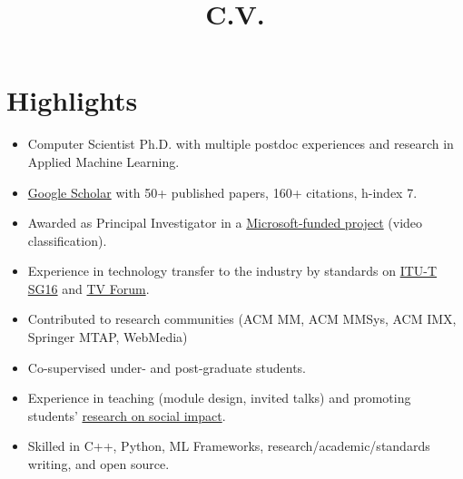 \documentclass[10pt,a4paper,sans,colorlinks]{moderncv}
\title{C.V.}
\begin{document}
\setHyperrefBlueLinks
\makecvtitle
\vspace{-2em}

\section{Highlights}

\begin{itemize}
    \item Computer Scientist Ph.D. with multiple postdoc experiences and research in Applied Machine Learning.
    \item \href{https://scholar.google.com/citations?user=1bEOmkUAAAAJ&hl=en}{Google Scholar} with 50+ published papers, 160+ citations, h-index 7.
    \item Awarded  as Principal Investigator in a \href{https://www.rnp.br/en/rnp-and-microsoft-challenge-artificial-intelligence}{Microsoft-funded project} (video classification).
    \item Experience in technology transfer to the industry by standards on \href{http://www.itu.int/en/ITU-T/studygroups/2022-2024/16}{ITU-T SG16} and \href{http://forumsbtvd.org.br}{TV Forum}.
    \item Contributed to research communities (ACM MM, ACM MMSys, ACM IMX, Springer MTAP, WebMedia)
    \item Co-supervised under- and post-graduate students.
    \item Experience in teaching  (module design, invited talks) and promoting students' \href{https://webmedia.org.br/2022/en/lf-award/}{research on social impact}.
    \item Skilled in C++, Python, ML Frameworks, research/academic/standards writing, and open source.
\end{itemize}


\end{document}
